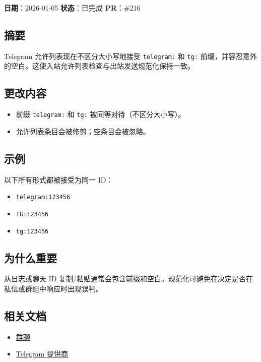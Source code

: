 \textbf{日期}：2026-01-05
\textbf{状态}：已完成
\textbf{PR}：\#216

\subsection{摘要}


Telegram 允许列表现在不区分大小写地接受 \texttt{telegram:} 和 \texttt{tg:} 前缀，并容忍意外的空白。这使入站允许列表检查与出站发送规范化保持一致。

\subsection{更改内容}


\begin{itemize}
  \item 前缀 \texttt{telegram:} 和 \texttt{tg:} 被同等对待（不区分大小写）。
  \item 允许列表条目会被修剪；空条目会被忽略。
\end{itemize}


\subsection{示例}


以下所有形式都被接受为同一 ID：

\begin{itemize}
  \item \texttt{telegram:123456}
  \item \texttt{TG:123456}
  \item \texttt{tg:123456}
\end{itemize}


\subsection{为什么重要}


从日志或聊天 ID 复制/粘贴通常会包含前缀和空白。规范化可避免在决定是否在私信或群组中响应时出现误判。

\subsection{相关文档}


\begin{itemize}
  \item \href{/channels/groups}{群聊}
  \item \href{/channels/telegram}{Telegram 提供商}
\end{itemize}



\clearpage

